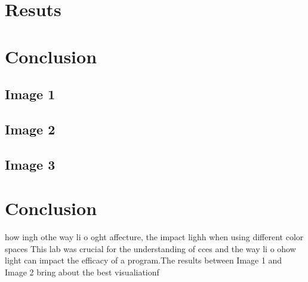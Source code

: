 \documentclass[journal]{IEEEtran}
\begin{document}
\section{Resuts}

\section{Conclusion}

\subsection{Image 1}
\subsection{Image 2}
\subsection{Image 3}

\section{Conclusion}
how ingh othe way li o oght affecture, the impact lighh when using different color spaces 
This lab was crucial for the understanding of cces and the way li o ohow light can impact the efficacy of a program.The results between Image 1 and Image 2 bring about the best visualiationf 



% 
\end{document}
